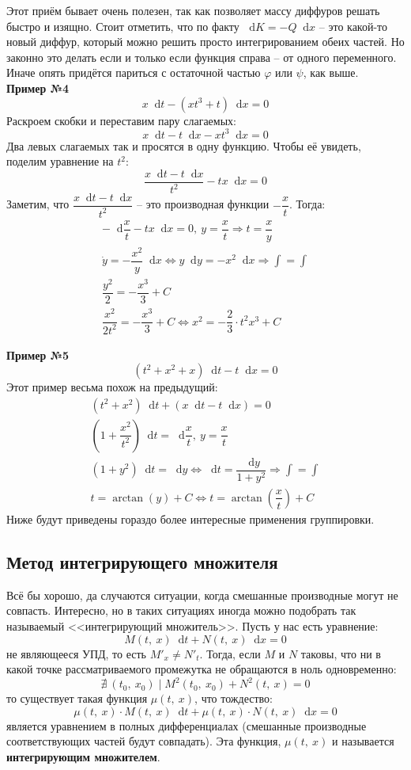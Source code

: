 \documentclass[a4paper,12pt]{article}
\renewcommand*\d{\mathop{}\!\mathrm{d}}
\newcommand{\dy}{\dot{y}}
\newcommand{\fe}{\varphi}
\newcommand{\ds}{\displaystyle}
\begin{document}
Этот приём бывает очень полезен, так как позволяет массу диффуров решать быстро и изящно. Стоит отметить, что по факту $\d K = -Q\d x$ -- это какой-то новый диффур, который можно решить просто интегрированием обеих частей. Но законно это делать если и только если функция справа -- от одного переменного. Иначе опять придётся париться с остаточной частью $\fe$ или $\psi$, как выше.
\ \\

\textbf{Пример №4}
\[x\d t - (xt^3 + t)\d x = 0\]
Раскроем скобки и переставим пару слагаемых:
\[x\d t - t\d x - xt^3\d x = 0\]
Два левых слагаемых так и просятся в одну функцию. Чтобы её увидеть, поделим уравнение на $t^2$:
\[\dfrac{x\d t - t\d x}{t^2} - tx\d x = 0\]
Заметим, что $\dfrac{x\d t - t\d x}{t^2}$ -- это производная функции $-\dfrac{x}{t}$. Тогда:
\begin{gather*}
-\d \dfrac{x}{t} - tx\d x = 0,\ y = \dfrac{x}{t} \Longrightarrow t = \dfrac{x}{y}\\
\dy = -\dfrac{x^2}{y}\d x \iff y\d y = -x^2\d x \Longrightarrow \ds\int = \int \\
\dfrac{y^2}{2} = -\dfrac{x^3}{3} + C\\
\dfrac{x^2}{2t^2} = -\dfrac{x^3}{3} + C \iff x^2 = -\dfrac{2}{3} \cdot t^2x^3 + C
\end{gather*}

\textbf{Пример №5}
\[(t^2 + x^2 + x)\d t - t\d x = 0\]
Этот пример весьма похож на предыдущий:
\begin{gather*}
	(t^2 + x^2)\d t + (x\d t - t\d x) = 0\\
	\left(1 + \dfrac{x^2}{t^2}\right)\d t = \d \dfrac{x}{t},\ y = \dfrac{x}{t}\\
	(1 + y^2)\d t = \d y\iff \d t = \dfrac{\d y}{1 + y^2}\Longrightarrow\ds\int = \int\\
	t = \arctan(y) + C \iff t  = \arctan(\dfrac{x}{t}) + C
\end{gather*}
Ниже будут приведены гораздо более интересные применения группировки.

\subsection{Метод интегрирующего множителя}

Всё бы хорошо, да случаются ситуации, когда смешанные производные могут не совпасть. Интересно, но в таких ситуациях иногда можно подобрать так называемый <<интегрирующий множитель>>. Пусть у нас есть уравнение:
\[M(t,\ x)\d t + N(t,\ x)\d x = 0\] не являющееся УПД, то есть $M'_x \neq N'_t$. Тогда, если $M$ и $N$ таковы, что ни в какой точке рассматриваемого промежутка не обращаются в ноль одновременно:
\[\nexists\ (t_0,\ x_0) \mid M^2(t_0,\ x_0) + N^2(t,\ x) = 0\] то существует такая функция $\mu(t,\ x)$, что тождество:
\[\mu(t,\ x) \cdot M(t,\ x) \d t + \mu(t,\ x) \cdot N(t,\ x) \d x = 0\]
является уравнением в полных дифференциалах (смешанные производные соответствующих частей будут совпадать). Эта функция, $\mu(t,\ x)$ и называется \textbf{интегрирующим множителем}.
\end{document}

